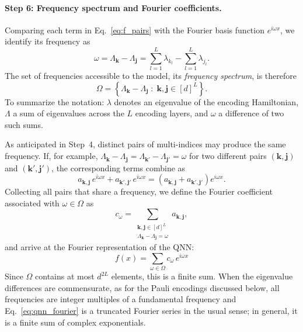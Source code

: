 \documentclass[12pt]{article}
\numberwithin{equation}{section}  %
\begin{document}
\paragraph{Step 6: Frequency spectrum and Fourier coefficients.} Comparing each term in Eq.~\eqref{eq:f_pairs} with the Fourier basis function $e^{i\omega x}$, we identify its frequency as
\begin{equation}
\omega = \Lambda_{\mathbf{k}} - \Lambda_{\mathbf{j}} = \sum_{l=1}^{L} \lambda_{k_l} - \sum_{l=1}^{L} \lambda_{j_l}.
\end{equation}
The set of frequencies accessible to the model, its \emph{frequency spectrum}, is therefore
\begin{equation}
\Omega = \left\{ \Lambda_{\mathbf{k}} - \Lambda_{\mathbf{j}} \;:\; \mathbf{k}, \mathbf{j} \in [d]^L \right\}.
\label{eq:spectrum}
\end{equation}
To summarize the notation: $\lambda$ denotes an eigenvalue of the encoding Hamiltonian, $\Lambda$ a sum of eigenvalues across the $L$ encoding layers, and $\omega$ a difference of two such sums.

As anticipated in Step~4, distinct pairs of multi-indices may produce the same frequency. If, for example, $\Lambda_{\mathbf{k}} - \Lambda_{\mathbf{j}} = \Lambda_{\mathbf{k}'} - \Lambda_{\mathbf{j}'} = \omega$ for two different pairs $(\mathbf{k},\mathbf{j})$ and $(\mathbf{k}',\mathbf{j}')$, the corresponding terms combine as
\begin{equation}
a_{\mathbf{k},\mathbf{j}}\, e^{i\omega x} + a_{\mathbf{k}',\mathbf{j}'}\, e^{i\omega x} = \left( a_{\mathbf{k},\mathbf{j}} + a_{\mathbf{k}',\mathbf{j}'} \right) e^{i\omega x}.
\end{equation}
Collecting all pairs that share a frequency, we define the Fourier coefficient associated with $\omega \in \Omega$ as
\begin{equation}
c_\omega = \sum_{\substack{\mathbf{k},\mathbf{j} \in [d]^L \\ \Lambda_{\mathbf{k}}-\Lambda_{\mathbf{j}} = \omega}} a_{\mathbf{k},\mathbf{j}},
\label{eq:qnn_fourier_coefficients}
\end{equation}
and arrive at the Fourier representation of the QNN:
\begin{equation}
\boxed{\, f(x) = \sum_{\omega \in \Omega} c_\omega\, e^{i\omega x} \,}
\label{eq:qnn_fourier}
\end{equation}
Since $\Omega$ contains at most $d^{2L}$ elements, this is a finite sum. When the eigenvalue differences are commensurate, as for the Pauli encodings discussed below, all frequencies are integer multiples of a fundamental frequency and Eq.~\eqref{eq:qnn_fourier} is a truncated Fourier series in the usual sense; in general, it is a finite sum of complex exponentials.
\end{document}
